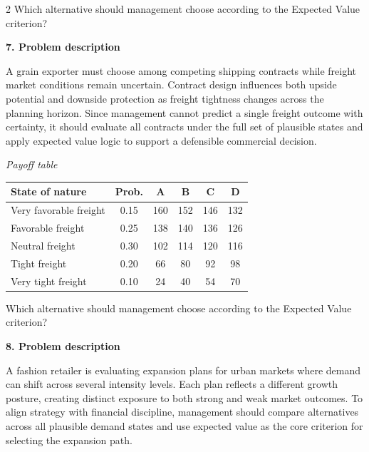 \documentclass[12pt]{article}
\newcommand{\SubsectionBox}[1]{%
	\noindent\colorbox{gray!30}{%
		\parbox{\linewidth}{\textbf{#1}}%
	}\par\vspace{0.35cm}%
}
\begin{document}
\begin{multicols}{2}
				Which alternative should management choose according to the Expected Value criterion?

		\vspace{0.25cm}
		\SubsectionBox{7. Problem description}\vspace{-0.25cm}
		A grain exporter must choose among competing shipping contracts while freight market conditions remain uncertain. Contract design influences both upside potential and downside protection as freight tightness changes across the planning horizon. Since management cannot predict a single freight outcome with certainty, it should evaluate all contracts under the full set of plausible states and apply expected value logic to support a defensible commercial decision.
		
				\begin{center}
					\textit{Payoff table}
					\begin{tabular}{l c c c c c}
						\toprule
						State of nature & Prob. &  A & B & C & D \\
						\midrule
						Very favorable freight & 0.15 & 160 & 152 & 146 & 132 \\
						Favorable freight & 0.25 & 138 & 140 & 136 & 126 \\
						Neutral freight & 0.30 & 102 & 114 & 120 & 116 \\
						Tight freight & 0.20 & 66 & 80 & 92 & 98 \\
						Very tight freight & 0.10 & 24 & 40 & 54 & 70 \\
						\bottomrule
					\end{tabular}
				\end{center}
		
				Which alternative should management choose according to the Expected Value criterion?

		\vspace{0.25cm}
		\SubsectionBox{8. Problem description}\vspace{-0.25cm}
		A fashion retailer is evaluating expansion plans for urban markets where demand can shift across several intensity levels. Each plan reflects a different growth posture, creating distinct exposure to both strong and weak market outcomes. To align strategy with financial discipline, management should compare alternatives across all plausible demand states and use expected value as the core criterion for selecting the expansion path.
		

\end{multicols}
\end{document}
